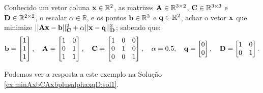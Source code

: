 \begin{example}
\label{ex:minAxbCAxbplusalphaxqD1}
Conhecido 
um vetor coluna $\VECTOR{x}\in \mathbb{R}^2$,
as matrizes $\MATRIX{A} \in \mathbb{R}^{3\times 2}$, $\MATRIX{C} \in \mathbb{R}^{3\times 3}$  e $\MATRIX{D} \in \mathbb{R}^{2\times 2}$,
o escalar $\alpha \in \mathbb{R}$,
e os pontos $\VECTOR{b} \in \mathbb{R}^{3}$ e $\VECTOR{q} \in \mathbb{R}^{2}$,
achar o vetor $\VECTOR{x}$ que minimize 
$||\MATRIX{A}\VECTOR{x}-\VECTOR{b}||_{\MATRIX{C}}^2+\alpha ||\VECTOR{x}-\VECTOR{q}||_{\MATRIX{D}}^2$;
sabendo que:
\begin{equation}
\VECTOR{b}=\begin{bmatrix}
1\\
1\\
1
\end{bmatrix},
\quad 
\MATRIX{A}=\begin{bmatrix}
1 & 0\\
0 & 1\\
1 & 1
\end{bmatrix},
\quad 
\MATRIX{C}=\begin{bmatrix}
1 & 0 & 0\\
0 & 1 & 0\\
0 & 0 & 1 
\end{bmatrix},
\quad \alpha=0.5,
\quad
\VECTOR{q}=\begin{bmatrix}
0\\
0
\end{bmatrix},
\quad 
\MATRIX{D}=\begin{bmatrix}
1 & 0\\
0 & 1
\end{bmatrix}.
\end{equation}

Podemos ver a resposta a este exemplo na Solução \ref{ex:minAxbCAxbplusalphaxqD:sol1}.
\end{example}


